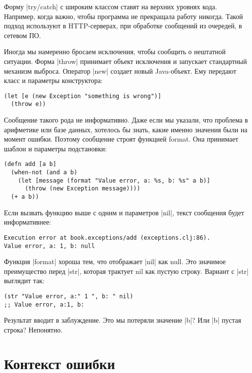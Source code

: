 Форму \spverb|try/catch| с широким классом ставят на верхних уровнях кода. Например,
когда важно, чтобы программа не прекращала работу никогда. Такой подход
используют в HTTP-серверах, при обработке сообщений из очередей, в сетевом ПО.

Иногда мы намеренно бросаем исключения, чтобы сообщить о нештатной
ситуации. Форма \spverb|throw| принимает объект исключения и запускает стандартный
механизм выброса. Оператор \spverb|new| создает новый Java-объект. Ему передают класс и
параметры конструктора:

\begin{verbatim}
(let [e (new Exception "something is wrong")]
  (throw e))
\end{verbatim}

Сообщение такого рода не информативно. Даже если мы указали, что проблема в
арифметике или базе данных, хотелось бы знать, какие именно значения были на
момент ошибки. Поэтому сообщение строят функцией format. Она принимает шаблон и
параметры подстановки:

\begin{verbatim}
(defn add [a b]
  (when-not (and a b)
    (let [message (format "Value error, a: %s, b: %s" a b)]
      (throw (new Exception message))))
  (+ a b))
\end{verbatim}

Если вызвать функцию выше с одним и параметров \spverb|nil|, текст сообщения будет
информативнее:

\begin{verbatim}
Execution error at book.exceptions/add (exceptions.clj:86).
Value error, a: 1, b: null
\end{verbatim}

Функция \spverb|format| хороша тем, что отображает \spverb|nil| как null. Это значимое
преимущество перед \spverb|str|, которая трактует nil как пустую строку. Вариант с
\spverb|str| выглядит так:

\begin{verbatim}
(str "Value error, a:" 1 ", b: " nil)
;; Value error, a:1, b:
\end{verbatim}

Результат вводит в заблуждение. Это мы потеряли значение \spverb|b|? Или \spverb|b| пустая
строка? Непонятно.

\section{Контекст ошибки}


